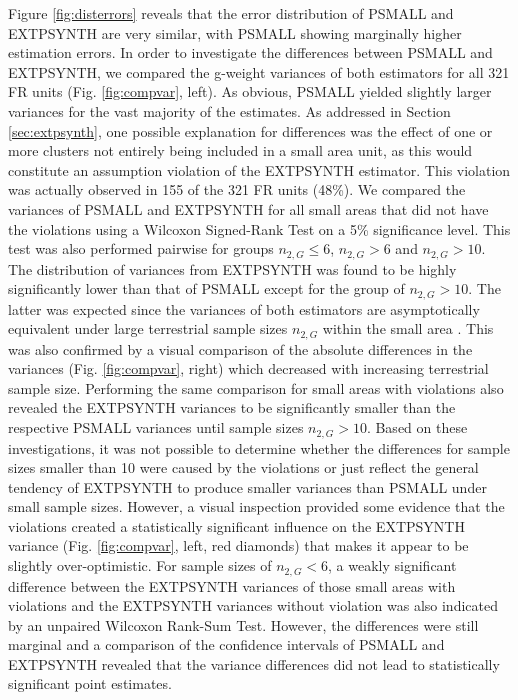 \documentclass[remotesensing,article,submit,moreauthors,pdftex,10pt,a4paper]{mdpi}
\newcommand{\psmall}{PSMALL}
\newcommand{\extpsynth}{EXTPSYNTH}
\begin{document}
Figure \ref{fig:disterrors} reveals that the error distribution of \psmall{} and \extpsynth{} are very similar, with \psmall{} showing marginally higher estimation errors. In order to investigate the differences between \psmall{} and \extpsynth{}, we compared the g-weight variances of both estimators for all 321 FR units (Fig. \ref{fig:compvar}, left). As obvious, \psmall{} yielded slightly larger variances for the vast majority of the estimates. As addressed in Section \ref{sec:extpsynth}, one possible explanation for differences was the effect of one or more clusters not entirely being included in a small area unit, as this would constitute an assumption violation of the \extpsynth{} estimator. This violation was actually observed in 155 of the 321 FR units (48\%). We compared the variances of \psmall{} and \extpsynth{} for all small areas that did not have the violations using a Wilcoxon Signed-Rank Test \citep{wilcoxon1970} on a 5\% significance level. This test was also performed pairwise for groups $n_{2,G} \leq 6$, $n_{2,G} > 6$ and $n_{2,G} > 10$. The distribution of variances from \extpsynth{} was found to be highly significantly lower than that of \psmall{} except for the group of $n_{2,G} > 10$. The latter was expected since the variances of both estimators are asymptotically equivalent under large terrestrial sample sizes $n_{2,G}$ within the small area \citep[pp.17--18]{mandallaz2016}. This was also confirmed by a visual comparison of the absolute differences in the variances (Fig. \ref{fig:compvar}, right) which decreased with increasing terrestrial sample size. Performing the same comparison for small areas with violations also revealed the \extpsynth{} variances to be significantly smaller than the respective \psmall{} variances until sample sizes $n_{2,G} > 10$. Based on these investigations, it was not possible to determine whether the differences for sample sizes smaller than 10 were caused by the violations or just reflect the general tendency of \extpsynth{} to produce smaller variances than \psmall{} under small sample sizes. However, a visual inspection provided some evidence that the violations created a statistically significant influence on the \extpsynth{} variance (Fig. \ref{fig:compvar}, left, red diamonds) that makes it appear to be slightly over-optimistic. For sample sizes of $n_{2,G} < 6$, a weakly significant difference between the \extpsynth{} variances of those small areas with violations and the \extpsynth{} variances without violation was also indicated by an unpaired Wilcoxon Rank-Sum Test. However, the differences were still marginal and a comparison of the confidence intervals of \psmall{} and \extpsynth{} revealed that the variance differences did not lead to statistically significant point estimates.
\end{document}
